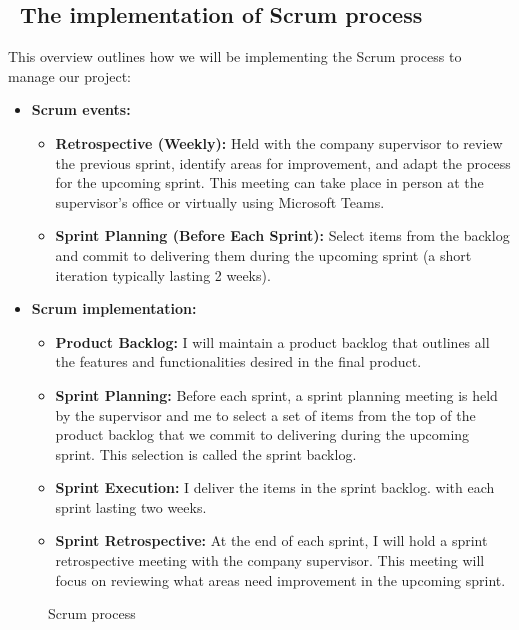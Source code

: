 \subsection*{ \textbullet\ The implementation of Scrum process}
This overview outlines how we will be implementing the Scrum process to manage our project:
\begin{itemize}
    \item \textbf{Scrum events:} \begin{itemize}
              \item \textbf{Retrospective (Weekly):} Held with the company supervisor to review the previous sprint, identify areas for improvement, and adapt the process for the upcoming sprint. This meeting can take place in person at the supervisor's office or virtually using Microsoft Teams.
              \item \textbf{Sprint Planning (Before Each Sprint):} Select items from the backlog and commit to delivering them during the upcoming sprint (a short iteration typically lasting 2 weeks).
          \end{itemize}
    \item \textbf{Scrum implementation:} \begin{itemize}
              \item \textbf{Product Backlog:} I will maintain a product backlog that outlines all the features and functionalities desired in the final product.
              \item \textbf{Sprint Planning:} Before each sprint, a sprint planning meeting is held by the supervisor and me to select a set of items from the top of the product backlog that we commit to delivering during the upcoming sprint. This selection is called the sprint backlog.
              \item \textbf{Sprint Execution:} I deliver the items in the sprint backlog. with each sprint lasting two weeks.
              \item \textbf{Sprint Retrospective:} At the end of each sprint, I will hold a sprint retrospective meeting with the company supervisor. This meeting will focus on reviewing what areas need improvement in the upcoming sprint.
          \end{itemize}
\end{itemize}

\begin{figure}[htpb]
    \centering
    \caption{Scrum process \cite{webArticle2}}
    \label{fig:scrum_process}
\end{figure}

